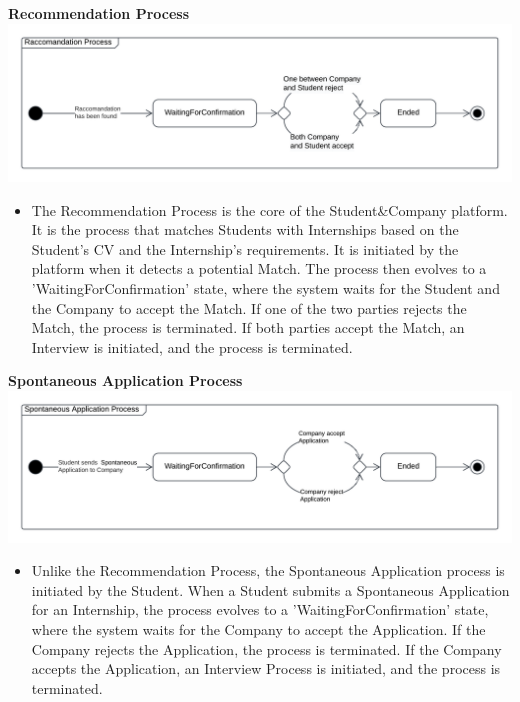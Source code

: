 \textbf{Recommendation Process}\\
\includegraphics[width=1 \textwidth]{Images/RaccomandationStateChart.png}
\begin{itemize}
    \item The Recommendation Process is the core of the Student\&Company platform. It is the process that matches Students with Internships based on the Student's CV and the Internship's requirements. It is initiated by the platform when it detects a potential Match. The process then evolves to a 'WaitingForConfirmation' state, where the system waits for the Student and the Company to accept the Match. If one of the two parties rejects the Match, the process is terminated. If both parties accept the Match, an Interview is initiated, and the process is terminated.
\end{itemize}

\textbf{Spontaneous Application Process}\\
\includegraphics[width=1 \textwidth]{Images/SpontaneousApplicationStateChart.png}
\begin{itemize}
    \item Unlike the Recommendation Process, the Spontaneous Application process is initiated by the Student. When a Student submits a Spontaneous Application for an Internship, the process evolves to a 'WaitingForConfirmation' state, where the system waits for the Company to accept the Application. If the Company rejects the Application, the process is terminated. If the Company accepts the Application, an Interview Process is initiated, and the process is terminated.
\end{itemize} 
\newpage 

